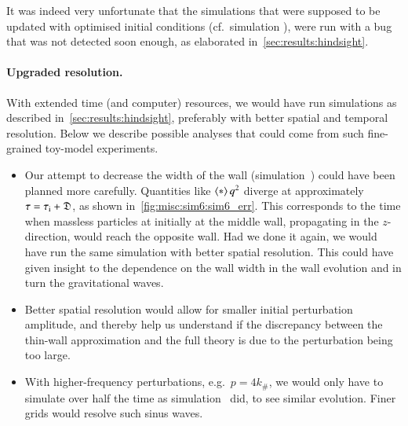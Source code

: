 

It was indeed very unfortunate that the simulations that were supposed to be updated with optimised initial conditions (cf.~simulation ), were run with {a bug that was not detected soon enough}, as elaborated in~\cref{sec:results:hindsight}. 

\paragraph{Upgraded resolution.} %
With extended time (and computer) resources, we would have run simulations as described in~\cref{sec:results:hindsight}, preferably with better spatial and temporal resolution. Below we describe possible analyses that could come from such fine-grained toy-model experiments.
\begin{itemize}
    \item Our attempt to decrease the width of the wall (simulation~) could have been planned more carefully. Quantities like $\left\langle{*}\right\rangle{q^2}$ diverge at approximately $\tau={\tau_\mathrm{i}+ \mathfrak{D}}$, as shown in~\cref{fig:misc:sim6:sim6_err}. This corresponds to the time when massless particles at initially at the middle wall, propagating in the $z$-direction, would reach the opposite wall. 
    Had we done it again, we would have run the same simulation with better spatial resolution. This could have given insight to the dependence on the wall width in the wall evolution and in turn the gravitational waves.
    \item Better spatial resolution would allow for smaller initial perturbation amplitude, and thereby help us understand if the discrepancy between the thin-wall approximation and the full theory is due to the perturbation being too large.
    \item With higher-frequency perturbations, e.g.~$p=4 k_\#$, we would only have to simulate over half the time as simulation~ did, to see similar evolution. Finer grids would resolve such sinus waves.
\end{itemize}
